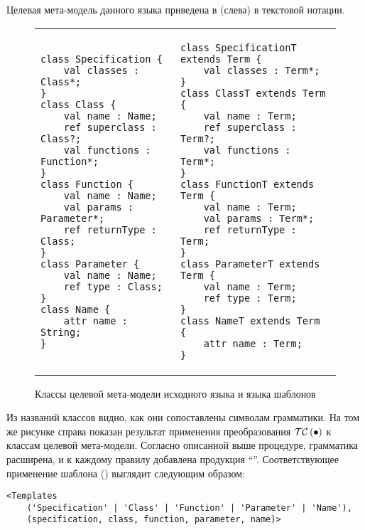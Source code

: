 Целевая мета-модель данного языка приведена в  (слева) в текстовой нотации. 
\begin{figure}[htbp]
	\centering
\begin{tabular}{b{}b{}}
\begin{lstlisting}[xleftmargin=0cm,framesep=0pt]
class Specification { 
	val classes : Class*; 
}
class Class {
	val name : Name;
	ref superclass : Class?;
	val functions : Function*;
}
class Function {
	val name : Name;
	val params : Parameter*;
	ref returnType : Class;
}
class Parameter {
	val name : Name;
	ref type : Class;
}
class Name { 
	attr name : String; 
}\end{lstlisting}%
&
\begin{lstlisting}[xleftmargin=0cm,framesep=0pt]
class SpecificationT extends Term { 
	val classes : Term*; 
}
class ClassT extends Term {
	val name : Term;
	ref superclass : Term?;
	val functions : Term*;
}
class FunctionT extends Term {
	val name : Term;
	val params : Term*;
	ref returnType : Term;
}
class ParameterT extends Term {
	val name : Term;
	ref type : Term;
}
class NameT extends Term { 
	attr name : Term; 
}\end{lstlisting}%
\end{tabular}
	\caption{Классы целевой мета-модели исходного языка и языка шаблонов }\label{ToyMM}
\end{figure}
Из названий классов видно, как они сопоставлены символам грамматики. На том же рисунке справа показан результат применения преобразования $\mathcal{TC}\left(\bullet\right)$ к классам целевой мета-модели. Согласно описанной выше процедуре, грамматика расширена, и к каждому правилу добавлена продукция ``''.
Соответствующее применение шаблона  () выглядит следующим образом:
\begin{lstlisting}
<Templates 
	('Specification' | 'Class' | 'Function' | 'Parameter' | 'Name'),
	(specification, class, function, parameter, name)>
\end{lstlisting}

